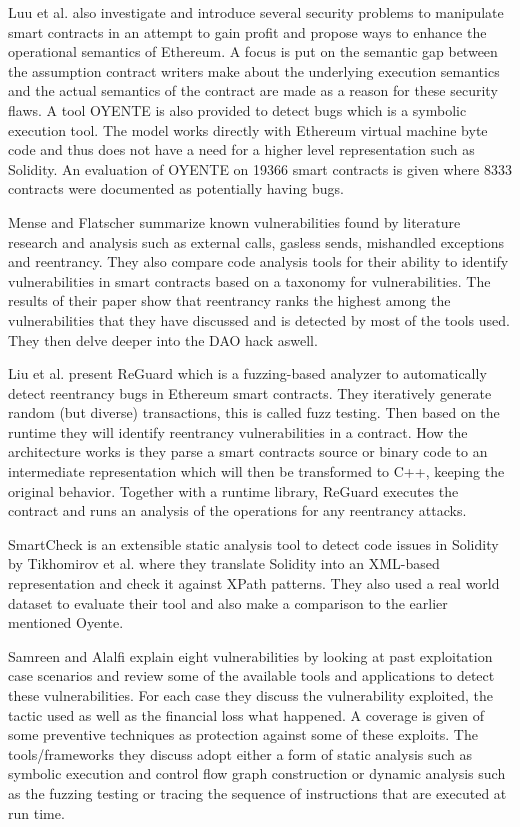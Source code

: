 \documentclass[sigconf]{acmart}
\begin{document}
Luu et al.  \cite{smarter} also investigate and introduce several security problems to manipulate smart contracts in an attempt to gain profit and propose ways to enhance the operational semantics of Ethereum. A focus is put on the semantic gap between the assumption contract writers make about the underlying execution semantics and the actual semantics of the contract are made as a reason for these security flaws. A tool OYENTE is also provided to detect bugs which is a symbolic execution tool. The model works directly with Ethereum virtual machine byte code and thus does not have a need for a higher level representation such as Solidity. An evaluation of OYENTE on 19366 smart contracts is given where 8333 contracts were documented as potentially having bugs.

Mense and Flatscher \cite{security} summarize known vulnerabilities found by literature research and analysis such as external calls, gasless sends, mishandled exceptions and reentrancy. They also compare code analysis tools for their ability to identify vulnerabilities in smart contracts based on a taxonomy for vulnerabilities. The results of their paper show that reentrancy ranks the highest among the vulnerabilities that they have discussed and is detected by most of the tools used. They then delve deeper into the DAO hack aswell. 


Liu et al. \cite{reguard} present ReGuard which is a fuzzing-based analyzer to automatically detect reentrancy bugs in Ethereum smart contracts. They iteratively generate random (but diverse) transactions, this is called fuzz testing. Then based on the runtime they will identify reentrancy vulnerabilities in a contract. How the architecture works is they parse a smart contracts source or binary code to an intermediate representation which will then be transformed to C++, keeping the original behavior. Together with a runtime library, ReGuard executes the contract and runs an analysis of the operations for any reentrancy attacks.


SmartCheck is an extensible static analysis tool to detect code issues in Solidity by Tikhomirov et al.\cite{smartcheck} where they translate Solidity into an XML-based representation and check it against XPath patterns. They also used a real world dataset to evaluate their tool and also make a comparison to the earlier mentioned Oyente. 


Samreen and Alalfi  \cite{survey} explain eight vulnerabilities by looking at past exploitation case scenarios and review some of the available tools and applications to detect these vulnerabilities. For each case they discuss the vulnerability exploited, the tactic used as well as the financial loss what happened. A coverage is given of some preventive techniques as protection against some of these exploits. The tools/frameworks they discuss adopt either a form of static analysis such as symbolic execution and control flow graph construction or dynamic analysis such as the fuzzing testing or tracing the sequence of instructions that are executed at run time. 
\end{document}
